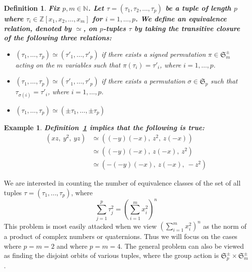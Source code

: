 \documentclass[12pt,table]{article}
\newtheorem{definition}[theorem]{Definition}
\newtheorem{example}[theorem]{Example}
\numberwithin{equation}{section}
\newcommand{\Nnn}{\mathbb N}
\newcommand{\Zzz}{\mathbb Z}
\begin{document}
\begin{landscape}
{{\begin{definition}
\label{def:general}
\bf
Fix $ p, m \in \Nnn $. 
Let $ \tau = ( \tau_1, \tau_2, \dotsc, \tau_p) $
be a tuple of length $ p $ where 
$ \tau_i \in \Zzz[x_1,x_2, \dotsc, x_m] $ for $ i = 1, \dotsc, p $.
We define an equivalence relation, denoted by $ \simeq $, on $p$-tuples
$ \tau $ 
by taking the transitive closure of the following three relations:
\begin{itemize}
\item
$ ( \tau_1, \dotsc, \tau_p) \simeq ( \tau'_1, \dotsc, \tau'_p) $
if there exists a signed permutation $ \pi \in \mathfrak{S}_m^\pm $
acting on the $ m $ variables such that $ \pi( \tau_i ) = \tau'_i $,
 where $ i = 1, \dotsc, p $.
\item
$ ( \tau_1, \dotsc, \tau_p) \simeq ( \tau'_1, \dotsc, \tau'_p) $
if there exists a permutation $ \sigma \in \mathfrak{S}_p $
such that $ \tau_{\sigma(i)} = \tau'_i $, where $ i = 1, \dotsc, p $.
\item
$ ( \tau_1, \dotsc, \tau_p) \simeq ( \pm \tau_1, \dotsc, \pm \tau_p) $
\end{itemize}
\end{definition}


\begin{example}
\bf
Definition~\ref{def:general} implies that the following is true:
\begin{align*}
( xz,\: y^2,\: yz )  
&\simeq ( (-y)(-x),\: z^2,\: z(-x) ) \\
&\simeq ( (-y)(-x),\: z(-x),\: z^2 ) \\
&\simeq ( -(-y)(-x),\: z(-x),\: -z^2 ) 
\end{align*}
\end{example}



We are interested in counting the number of
equivalence classes of the set of all tuples
 $ \tau = ( \tau_1, \dotsc, \tau_p) $,
where
\begin{equation}
\label{equation_general}
\sum_{j = 1}^{p}  \tau_j ^ 2  
= 
\left( \sum_{i = 1}^{m}  x_i ^ 2  \right) ^ n 
\end{equation}
This problem is most easily attacked when we
view $ \left( \sum_{i = 1}^{m}  x_i ^ 2  \right) ^ n $
as the norm of a product of complex numbers or quaternions.
Thus we will focus on the cases where $ p = m = 2 $ and where $ p = m = 4 $.
The general problem can also be viewed as finding the disjoint orbits of 
various tuples, where the group action is $ \mathfrak{S}_p^\pm \times \mathfrak{S}_m^\pm $.



}}
\end{landscape}
\end{document}
